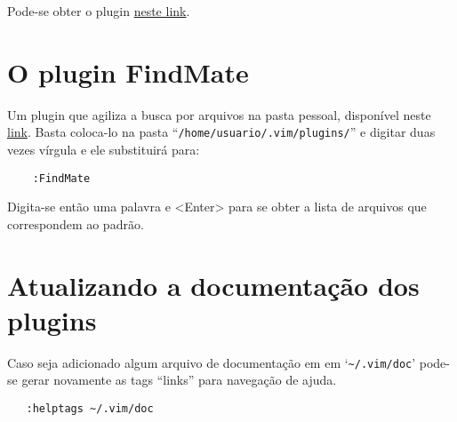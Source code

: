 Pode-se obter o plugin  \href{http://www.vim.org/scripts/script.php?script\_id=850}{neste link}.

\section{O plugin FindMate}
\label{sec:O plugin FindMate}

Um plugin que agiliza a busca por arquivos na pasta pessoal, disponível neste
 \href{http://snipt.net/voyeg3r/findmate-plugin-for-vim/}{link}. Basta
coloca-lo na pasta ``{\tt /home/usuario/.vim/plugins/}'' e digitar duas vezes
vírgula e ele substituirá para:

\begin{verbatim}
    :FindMate 
\end{verbatim}

Digita-se então uma palavra e <Enter> para se obter a lista de arquivos que
correspondem ao padrão.

\section{Atualizando a documentação dos plugins}
\label{sec:Atualizando a documentação dos plugins}

Caso seja adicionado algum arquivo de documentação em em `\verb+~/.vim/doc+' pode-se
gerar novamente as tags ``links'' para navegação de ajuda.

\begin{verbatim}
   :helptags ~/.vim/doc
\end{verbatim}
